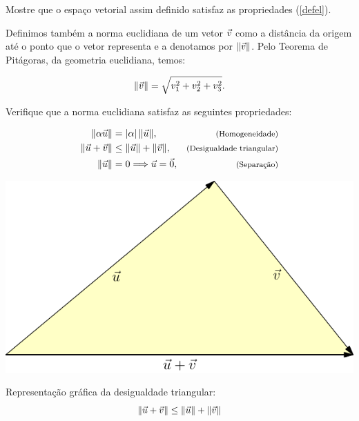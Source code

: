 \begin{prob} Mostre que o espaço vetorial assim definido satisfaz as propriedades (\ref{defel}).
\end{prob}

Definimos também a norma euclidiana de um vetor $\vec{v}$ como a distância da origem até o ponto que o vetor representa e a denotamos por $\|\vec{v}\|$. Pelo Teorema de Pitágoras, da geometria euclidiana, temos:


\begin{equation}\label{defnorma}\|\vec{v}\|=\sqrt{v_1^2+v_2^2+v_3^2}.\end{equation}
\begin{prob}\label{exnorma}Verifique que a norma euclidiana satisfaz as seguintes propriedades:
  
\begin{subequations}\label{propnorma}
\begin{align}
\|\alpha \vec{u}\|&=|\alpha|~\!\|\vec{u}\|,&\hbox{\footnotesize (Homogeneidade)}\label{propnormahom}\\
\|\vec{u}+\vec{v}\|&\leq \|\vec{u}\|+\|\vec{v}\|,&\hbox{\footnotesize (Desigualdade triangular)}\label{propnormatri}\\
\|\vec{u}\|&=0 \Longrightarrow \vec{u}=\vec{0},&\hbox{\footnotesize (Separação)}\label{propnormasep}
\end{align}
\end{subequations}
\end{prob}

\begin{marginfigure}%
 \includegraphics{./cap_algvet/pics/desigualdade_triangulo}
      \caption{Representação gráfica da desigualdade triangular: $$\|\vec{u}+\vec{v}\|\leq \|\vec{u}\|+\|\vec{v}\|$$}
      \label{fig:des_triang}
  \end{marginfigure}


